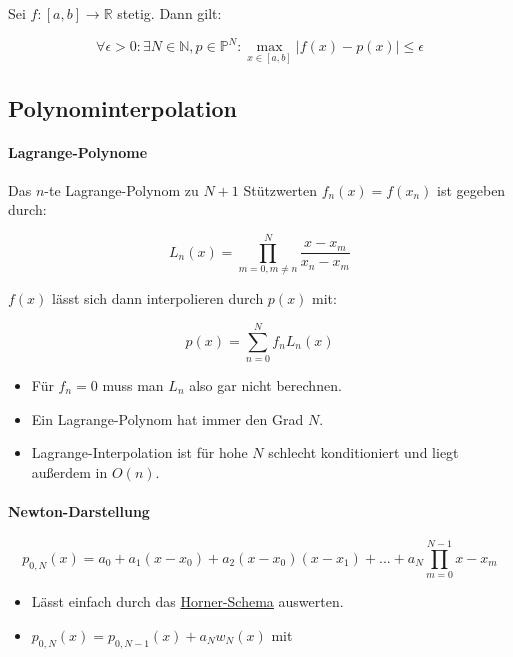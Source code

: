 \documentclass[a4paper, 14pt]{article}
\begin{document}
	Sei $f : [a, b] \to \mathbb{R}$ stetig. Dann gilt:

	\begin{equation}
		\forall \epsilon > 0 : \exists N \in \mathbb{N}, p \in \mathbb{P}^N : \max_{x \in [a, b]}{|f(x) - p(x)|} \leq \epsilon
	\end{equation}

	\subsection{Polynominterpolation}

	\paragraph{Lagrange-Polynome} Das $n$-te Lagrange-Polynom zu $N + 1$ Stützwerten $f_n(x) = f(x_n)$ ist gegeben durch:

	\begin{equation}
		L_n(x) = \prod_{m = 0,m \neq n}^{N}{\frac{x - x_m}{x_n - x_m}}
	\end{equation}

	$f(x)$ lässt sich dann interpolieren durch $p(x)$ mit:

	\begin{equation}
		p(x) = \sum_{n = 0}^{N}{f_n L_n(x)}
	\end{equation}

	\begin{itemize}
		\item Für $f_n = 0$ muss man $L_n$ also gar nicht berechnen.
		\item Ein Lagrange-Polynom hat immer den Grad $N$.
		\item Lagrange-Interpolation ist für hohe $N$ schlecht konditioniert und liegt außerdem in $O(n)$.
	\end{itemize}

	\paragraph{Newton-Darstellung}

	\begin{equation}
		p_{0, N}(x) = a_0 + a_1 (x - x_0) + a_2 (x - x_0) (x - x_1) + ... + a_N \prod_{m = 0}^{N - 1}{x - x_m}
	\end{equation}

	\begin{itemize}
		\item Lässt einfach durch das \href{https://de.wikipedia.org/wiki/Horner-Schema}{Horner-Schema} auswerten.
		\item $p_{0, N}(x) = p_{0, N - 1}(x) + a_N w_N(x)$ mit
	\end{itemize}
\end{document}
